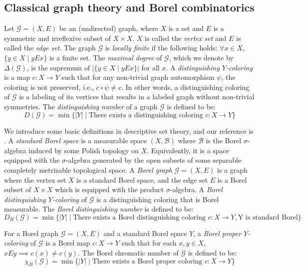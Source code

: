 \documentclass[11pt, reqno, a4paper]{amsart}
\theoremstyle{plain}
\theoremstyle{definition}
\theoremstyle{remark}
\begin{document}
\subsection{Classical graph theory and Borel combinatorics}
Let $\mathcal{G}=(X,E)$ be an (undirected) graph, where $X$ is a set and $E$ is a symmetric and irreflexive subset of $X\times X$. $X$ is called the \textit{vertex set} and $E$ is called the \textit{edge set}. The graph $\mathcal{G}$ is \textit{locally finite} if the following holds: $\forall x\in X$, $\{y\in X \mid yEx\}$ is a finite set. The \textit{maximal degree} of $\mathcal{G}$, which we denote by $\Delta(\mathcal{G})$, is the supremum of $|\{y\in X \mid yEx\}|$ for all $x$.
A \textit{distinguishing $Y$-coloring} is a map $c: X \longrightarrow Y$ such that for any non-trivial graph automorphism $\psi$, the coloring is not preserved, i.e., $c \circ \psi \neq c$. In other words, a distinguishing coloring of $\mathcal{G}$ is a labeling of its vertices that results in a labeled graph without non-trivial symmetries. The \textit{distinguishing number} of a graph $\mathcal{G}$ is defined to be:
\[ D(\mathcal{G})=\min\{|Y| \mid \text{There exists a distinguishing coloring } c: X \longrightarrow Y \} \]

We introduce some basic definitions in descriptive set theory, and our reference is \cite{Kec95}. A \textit{standard Borel space} is a measurable space $(X,\mathcal{B})$ where $\mathcal{B}$ is the Borel $\sigma$-algebra induced by some Polish topology on $X$. Equivalently, it is a space equipped with the $\sigma$-algebra generated by the open subsets of some separable completely metrizable topological space. A \textit{Borel graph} $\mathcal{G}=(X,E)$ is a graph where the vertex set $X$ is a standard Borel space, and the edge set $E$ is a Borel subset of $X \times X$ which is equipped with the product $\sigma$-algebra. A \textit{Borel distinguishing $Y$-coloring} of $\mathcal{G}$ is a distinguishing coloring that is Borel measurable. The \textit{Borel distinguishing number} is defined to be:
\[ D_B(\mathcal{G})=\min\{|Y| \mid \text{There exists a Borel distinguishing coloring } c: X \rightarrow Y,\text{Y is standard Borel}\} \]

 For a Borel graph $\mathcal{G}=(X,E)$ and a standard Borel space $Y$, a \textit{Borel proper $Y$-coloring} of $\mathcal{G}$ is a Borel map $c: X \longrightarrow Y$ such that for each $x,y\in X$, $xEy \implies c(x)\ne c(y)$. The Borel chromatic number of $\mathcal{G}$ is defined to be:
\[ \chi_B(\mathcal{G})=\min\{|Y| \mid \text{There exists a Borel proper coloring } c: X \longrightarrow Y\} \]
\end{document}
